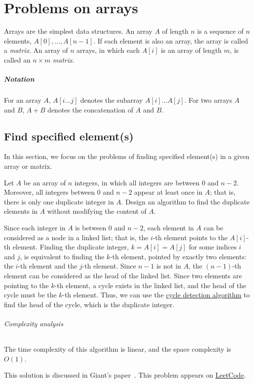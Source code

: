 \chapter{Problems on arrays}
Arrays are the simplest data structures.
An array $A$ of length $n$ is a sequence of $n$ elements, $A[0], \dots, A[n - 1]$.
If each element is also an array, the array is called a \emph{matrix}.
An array of $n$ arrays, in which each $A[i]$ is an array of length $m$, is called an $n \times m$ \emph{matrix}.

\paragraph{Notation}
For an array $A$, $A[i \dots j]$ denotes the subarray $A[i] \dots A[j]$.
For two arrays $A$ and $B$, $A + B$ denotes the concatenation of $A$ and $B$.

\section{Find specified element(s)}
In this section, we focus on the problems of finding specified element(s) in a given array or matrix.

\begin{Exercise}
Let $A$ be an array of $n$ integers, in which all integers are between 0 and $n - 2$.
Moreover, all integers between 0 and $n - 2$ appear at least once in $A$; that is, there is only one duplicate integer in $A$.
Design an algorithm to find the duplicate elements in $A$ without modifying the content of $A$.
\end{Exercise}

\begin{Answer}
Since each integer in $A$ is between $0$ and $n - 2$, each element in $A$ can be considered as a node in a linked list; that is, the $i$-th element points to the $A[i]$-th element.
Finding the duplicate integer, $k = A[i] = A[j]$ for some indices $i$ and $j$, is equivalent to finding the $k$-th element, pointed by exactly two elements: the $i$-th element and the $j$-th element.
Since $n - 1$ is not in $A$, the $(n - 1)$-th element can be considered as the head of the linked list. 
Since two elements are pointing to the $k$-th element, a cycle exists in the linked list, and the head of the cycle must be the $k$-th element.
Thus, we can use the \href{https://en.wikipedia.org/wiki/Cycle_detection}{cycle detection algorithm} to find the head of the cycle, which is the duplicate integer.

\subparagraph{Complexity analysis} The time complexity of this algorithm is linear, and the space complexity is $O(1)$.
\begin{remark}
This solution is discussed in Giant's paper~\cite{Ginat2012}.
This problem appears on \href{https://leetcode.com/problems/find-the-duplicate-number/}{LeetCode}.
\end{remark}
\end{Answer}

